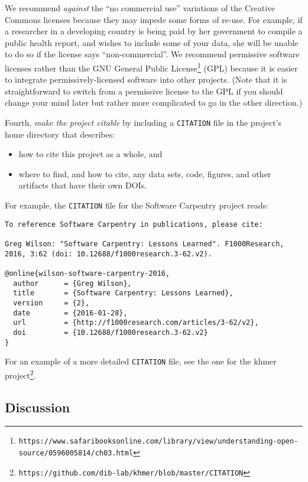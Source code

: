 \documentclass[10pt]{article}
\newcommand{\recommend}[1]{\textit{#1}}
\newcommand{\withurl}[2]{{#1}\footnote{\texttt{#2}}}
\begin{document}
We recommend \emph{against} the ``no commercial use'' variations of
the Creative Commons licenses because they may impede some forms of
re-use.  For example, if a researcher in a developing country is being
paid by her government to compile a public health report, and wishes
to include some of your data, she will be unable to do so if the
license says ``non-commercial''. We recommend permissive software
licenses rather than the \withurl{GNU General Public
  License}{https://www.safaribooksonline.com/library/view/understanding-open-source/0596005814/ch03.html}
(GPL) because it is easier to integrate permissively-licensed software
into other projects. (Note that it is straightforward to switch from a
permissive license to the GPL if you should change your mind later but
rather more complicated to go in the other direction.)

Fourth, \recommend{make the project citable} by including a
\texttt{CITATION} file in the project's home directory that describes:

\begin{itemize}
\item
  how to cite this project as a whole, and
\item
  where to find, and how to cite, any data sets, code, figures, and
  other artifacts that have their own DOIs.
\end{itemize}

For example, the \texttt{CITATION} file for the Software Carpentry
project reads:

\begin{verbatim}
To reference Software Carpentry in publications, please cite:

Greg Wilson: "Software Carpentry: Lessons Learned". F1000Research,
2016, 3:62 (doi: 10.12688/f1000research.3-62.v2).

@online{wilson-software-carpentry-2016,
  author      = {Greg Wilson},
  title       = {Software Carpentry: Lessons Learned},
  version     = {2},
  date        = {2016-01-28},
  url         = {http://f1000research.com/articles/3-62/v2},
  doi         = {10.12688/f1000research.3-62.v2}
}
\end{verbatim}

For an example of a more detailed \texttt{CITATION} file, see the one
for the \withurl{khmer
  project}{https://github.com/dib-lab/khmer/blob/master/CITATION}.

\subsection*{Discussion}
\end{document}
